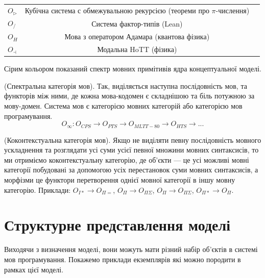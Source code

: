 \begin{definition}
\begin{table}
\begin{tabular}{lcc}
      \hline
       $O_{\triangleright}$            & Кубічна система с обмежувальною рекурсією (теореми про $\pi$-числення)\\
       $O_{/}$                         & Система фактор-типів (Lean) \\
       $O_{H}$                         & Мова з оператором Адамара (квантова фізика)\\
       $O_{\dashv}$                    & Модальна HoTT (фізика)\\
      \hline
  \end{tabular}
  \small Сірим кольором показаний спектр мовних примітивів ядра концептуальної моделі.
\end{table}
\end{definition}

\begin{definition} (Спектральна категорія мов).
Так, виділяється наступна послідовність мов, та функторів між ними,
де кожна мова-кодомен є складнішою та біль потужною за мову-домен.
Система мов є категорією мовних категорій або категорією мов програмування.
\begin{equation}
O_\infty : O_{CPS} \rightarrow O_{PTS} \rightarrow O_{MLTT-80} \rightarrow O_{HTS} \rightarrow ...
\end{equation}
\end{definition}

\begin{definition} (Коконтекстуальна категорія мов).
Якщо не виділяти певну послідовність мовного ускладнення та розглядати
усі суми усієї певної множини мовних синтаксисів, то ми отриміємо коконтекстуальну категорію,
де об'єкти --- це усі можливі мовні категорії побудовані за допомогою усіх перестановок суми мовних синтаксисів,
а морфізми це функтори перетворення однієї мовної категорії в іншу мовну категорію.
Приклади: $O_{I*} \rightarrow O_{\Pi=}$, $O_\Pi \rightarrow O_{\Pi\Sigma}$,
          $O_\Pi \rightarrow O_{\Pi\Sigma}$, $O_{\Pi*} \rightarrow O_\Pi$.
\end{definition}

\section{Структурне представлення моделі}
Виходячи з визначення моделі, вони можуть мати різний
набір об'єктів в системі мов програмування.
Покажемо приклади екземплярів які можно породити в рамках цієї моделі.

\newpage
